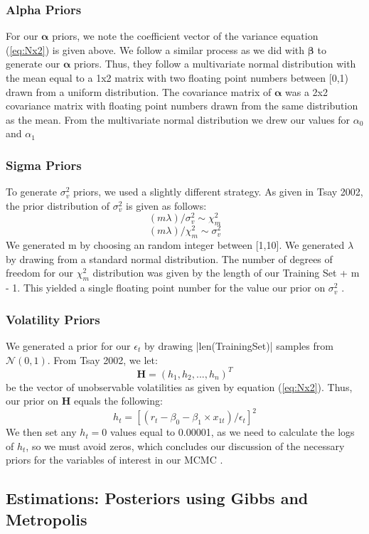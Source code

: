 \documentclass[letterpaper]{article}
\begin{document}
	\subsubsection{Alpha Priors}
	For our $\bm{\alpha}$ priors, we note the coefficient vector of the variance equation (\ref{eq:Nx2}) is given above. We follow a similar process as we did with $\bm{\beta}$ to generate our $\bm{\alpha}$ priors. Thus, they follow a multivariate normal distribution with the mean equal to a 1x2 matrix with two floating point numbers between [0,1) drawn from a uniform distribution. The covariance matrix of $\bm{\alpha}$ was a 2x2 covariance matrix with floating point numbers drawn from the same distribution as the mean. From the multivariate normal distribution we drew our values for $\alpha_{0}$ and $\alpha_{1}$ \cite{tsay2002}
	\subsubsection{Sigma Priors}
	To generate $\sigma_{v}^2$ priors, we used a slightly different strategy. As given in Tsay 2002, the prior distribution of $\sigma_{v}^2$ is given as follows:
	$$(m\lambda)/\sigma_{v}^2 \mathtt{\sim} \chi_{m}^2 $$
	$$(m\lambda)/\chi_{m}^2 \mathtt{\sim} \sigma_{v}^2$$
	We generated m by choosing an random integer between [1,10]. We generated $\lambda$ by drawing from a standard normal distribution. The number of degrees of freedom for our $\chi_{m}^2$ distribution was given by the length of our Training Set + m - 1. This yielded a single floating point number for the value our prior on $\sigma_{v}^2$ \cite{tsay2002}.
	
	\subsubsection{Volatility Priors}
	We generated a prior for our $\epsilon_{t}$ by drawing |len(TrainingSet)| samples from $\mathcal{N}(0,1)$. \newline
	From Tsay 2002, we let:
	$$\bm{H} = (h_{1}, h_{2}, ..., h_{n})^T$$
	be the vector of unobservable volatilities as given by equation (\ref{eq:Nx2}). Thus, our prior on $\bm{H}$ equals the following:
	$$ h_{t}= [(r_{t} - \beta_{0} - \beta_{1} \times x_{1t}) / \epsilon_{t}]^2 $$
	We then set any $h_{t} = 0$ values equal to 0.00001, as we need to calculate the logs of $h_{t}$, so we must avoid zeros, which concludes our discussion of the necessary priors for the variables of interest in our MCMC \cite{tsay2002}.
	
	\subsection{Estimations: Posteriors using Gibbs and Metropolis}
\end{document}
